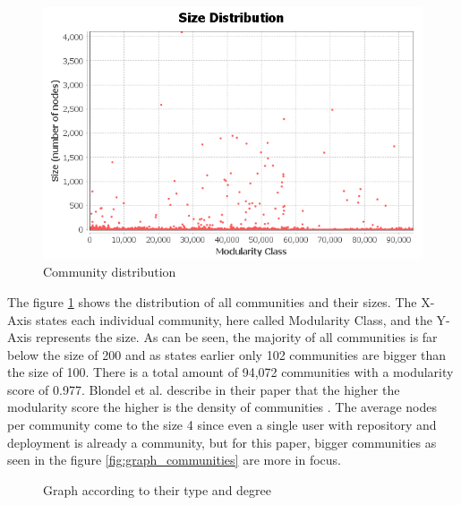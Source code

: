 \begin{figure}[H]
    \centering
    \includegraphics[scale=0.8]{graphics/modularity_stats.png}
    \caption{Community distribution}
    \label{fig:community_distribution}
\end{figure}

The figure \ref{fig:community_distribution} shows the distribution of all communities and their sizes. The X-Axis states each individual community, here called Modularity Class, and the Y-Axis represents the size. As can be seen, the majority of all communities is far below the size of 200 and as states earlier only 102 communities are bigger than the size of 100. There is a total amount of 94,072 communities with a modularity score of 0.977. Blondel et al. describe in their paper that the higher the modularity score the higher is the density of communities \cite{Blondel_2008}. The average nodes per community come to the size 4 since even a single user with repository and deployment is already a community, but for this paper, bigger communities as seen in the figure \ref{fig:graph_communities} are more in focus.

\begin{figure}[H]\centering
{}
    \caption{Graph according to their type and degree}
    \label{fig:graph_types}
\end{figure}

